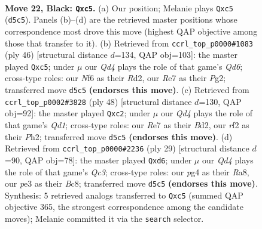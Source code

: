 \documentclass[11pt]{article}
\begin{document}
\clearpage

\begin{figure}[p]\centering
\begin{subfigure}{0.46\textwidth}\centering
\resizebox{\linewidth}{!}{%
\newchessgame
\chessboard[
  setfen={5rk1/3brppp/1n2pn2/p1Qq4/6P1/1P1NP3/P3BRPP/RN4K1 b - - 0 22},
  showmover=false,
  pgfstyle=straightmove, color=movearrow, markmove={d5-c5}
]}
\caption{}
\end{subfigure}\hfill
\begin{subfigure}{0.46\textwidth}\centering
\resizebox{\linewidth}{!}{%
\newchessgame
\chessboard[
  setfen={5rk1/1b1p1pp1/2rQ1n2/p1q1p2p/4P3/1PN1RB2/PK1R1PPP/8 w - - 2 24},
  showmover=false,
  pgfstyle=straightmove, color=movearrow, markmove={d6-c5}
]}
\caption{}
\end{subfigure}
\\[4pt]
\begin{subfigure}{0.46\textwidth}\centering
\resizebox{\linewidth}{!}{%
\newchessgame
\chessboard[
  setfen={2rbk2r/n3np2/4p1pp/p2pP3/3P4/3R1NP1/1PqB1P1P/2NQ1RK1 w k - 3 25},
  showmover=false,
  pgfstyle=straightmove, color=movearrow, markmove={d1-c2}
]}
\caption{}
\end{subfigure}\hfill
\begin{subfigure}{0.46\textwidth}\centering
\resizebox{\linewidth}{!}{%
\newchessgame
\chessboard[
  setfen={r1b2rk1/pp3ppp/2qQ1n2/1Nn1p3/P7/B1P5/P3BPPP/R4RK1 b - - 5 15},
  showmover=false,
  pgfstyle=straightmove, color=movearrow, markmove={c6-d6}
]}
\caption{}
\end{subfigure}
\caption{\textbf{Move 22, Black: \texttt{Qxc5}.} (a) Our position; Melanie plays \texttt{Qxc5} (\texttt{d5c5}). Panels (b)--(d) are the retrieved master positions whose correspondence most drove this move (highest QAP objective among those that transfer to it). (b) Retrieved from \texttt{ccrl\_top\_p0000\#1083} (ply 46) [structural distance $d$=134, QAP obj=103]: the master played \texttt{Qxc5}; under $\mu$ our \emph{Qd4} plays the role of that game's \emph{Qd6}; cross-type roles: our \emph{N}f6 as their \emph{R}d2, our \emph{R}e7 as their \emph{P}g2; transferred move \texttt{d5c5} \textbf{(endorses this move)}. (c) Retrieved from \texttt{ccrl\_top\_p0002\#3828} (ply 48) [structural distance $d$=130, QAP obj=92]: the master played \texttt{Qxc2}; under $\mu$ our \emph{Qd4} plays the role of that game's \emph{Qd1}; cross-type roles: our \emph{R}e7 as their \emph{B}d2, our \emph{r}f2 as their \emph{P}h2; transferred move \texttt{d5c5} \textbf{(endorses this move)}. (d) Retrieved from \texttt{ccrl\_top\_p0000\#2236} (ply 29) [structural distance $d$=90, QAP obj=78]: the master played \texttt{Qxd6}; under $\mu$ our \emph{Qd4} plays the role of that game's \emph{Qc3}; cross-type roles: our \emph{p}g4 as their \emph{R}a8, our \emph{p}e3 as their \emph{B}c8; transferred move \texttt{d5c5} \textbf{(endorses this move)}. Synthesis: 5 retrieved analogs transferred to \texttt{Qxc5} (summed QAP objective 365, the strongest correspondence among the candidate moves); Melanie committed it via the \texttt{search} selector.}
\label{fig:thought-m43}
\end{figure}
\end{document}
